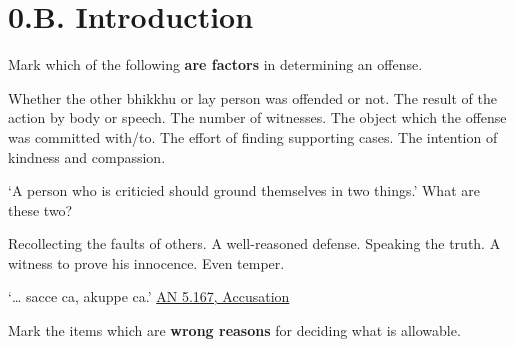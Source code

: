 \chapter{0.B. Introduction}
\renewcommand*{\theChapterTitle}{B. Introduction}

\begin{exam}{\autoExamName}

\begin{problem}

  Mark which of the following \textbf{are factors} in determining an offense.

  \bigskip

  \begin{answers}{1}
    \bChoices
     Whether the other bhikkhu or lay person was offended or not. \eAns
     The result of the action by body or speech. \eAns
     The number of witnesses. \eAns
     The object which the offense was committed with/to. \eAns
     The effort of finding supporting cases. \eAns
     The intention of kindness and compassion. \eAns
    \eChoices
  \end{answers}

\end{problem}

\problemDivide

\begin{problem}

  `A person who is criticied should ground themselves in two things.' What are these two?

  \bigskip

  \begin{answers}{1}
    \bChoices
     Recollecting the faults of others. \eAns
     A well-reasoned defense. \eAns
     Speaking the truth. \eAns
     A witness to prove his innocence. \eAns
     Even temper. \eAns
    \eChoices
  \end{answers}

  \begin{solution}
    `\ldots{} sacce ca, akuppe ca.' \href{https://suttacentral.net/an5.167/en/sujato}{AN 5.167, Accusation}
  \end{solution}

\end{problem}

\problemDivide

\begin{problem}

  Mark the items which are \textbf{wrong reasons} for deciding what is allowable.


\end{problem}
\end{exam}
